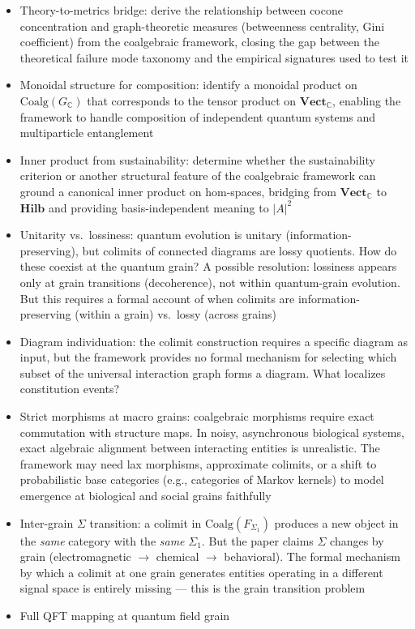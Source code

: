 \documentclass[12pt,a4paper]{article}
\begin{document}
\begin{itemize}
  \item Theory-to-metrics bridge: derive the relationship between cocone concentration and graph-theoretic measures (betweenness centrality, Gini coefficient) from the coalgebraic framework, closing the gap between the theoretical failure mode taxonomy and the empirical signatures used to test it
  \item Monoidal structure for composition: identify a monoidal product on $\text{Coalg}(G_\mathbb{C})$ that corresponds to the tensor product on $\mathbf{Vect}_{\mathbb{C}}$, enabling the framework to handle composition of independent quantum systems and multiparticle entanglement
  \item Inner product from sustainability: determine whether the sustainability criterion or another structural feature of the coalgebraic framework can ground a canonical inner product on hom-spaces, bridging from $\mathbf{Vect}_{\mathbb{C}}$ to $\mathbf{Hilb}$ and providing basis-independent meaning to $|A|^2$
  \item Unitarity vs.\ lossiness: quantum evolution is unitary (information-preserving), but colimits of connected diagrams are lossy quotients. How do these coexist at the quantum grain? A possible resolution: lossiness appears only at grain transitions (decoherence), not within quantum-grain evolution. But this requires a formal account of when colimits are information-preserving (within a grain) vs.\ lossy (across grains)
  \item Diagram individuation: the colimit construction requires a specific diagram as input, but the framework provides no formal mechanism for selecting which subset of the universal interaction graph forms a diagram. What localizes constitution events?
  \item Strict morphisms at macro grains: coalgebraic morphisms require exact commutation with structure maps. In noisy, asynchronous biological systems, exact algebraic alignment between interacting entities is unrealistic. The framework may need lax morphisms, approximate colimits, or a shift to probabilistic base categories (e.g., categories of Markov kernels) to model emergence at biological and social grains faithfully
  \item Inter-grain $\Sigma$ transition: a colimit in $\text{Coalg}(F_{\Sigma_1})$ produces a new object in the \emph{same} category with the \emph{same} $\Sigma_1$. But the paper claims $\Sigma$ changes by grain (electromagnetic $\to$ chemical $\to$ behavioral). The formal mechanism by which a colimit at one grain generates entities operating in a different signal space is entirely missing --- this is the grain transition problem
  \item Full QFT mapping at quantum field grain
\end{itemize}
\end{document}
